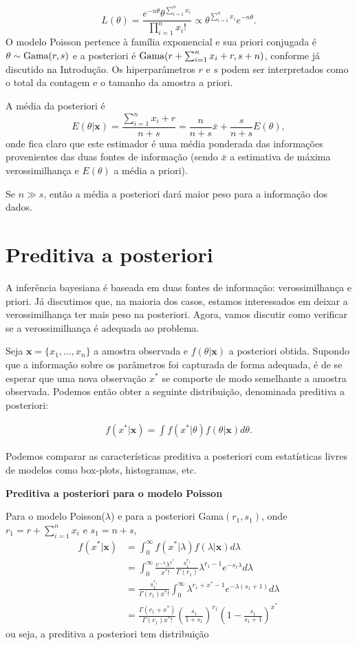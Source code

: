 \documentclass[
  letterpaper,
  DIV=11,
  numbers=noendperiod]{scrreprt}
\theoremstyle{definition}
\theoremstyle{definition}
\theoremstyle{plain}
\theoremstyle{remark}
\begin{document}
\[L(\theta)=\frac{e^{-n\theta}\theta^{\sum_{i=1}^{n}x_i}}{\prod_{i=1}^{n}x_i!}\propto \theta^{\sum_{i=1}^n x_i}e^{-n\theta}.\]
O modelo Poisson pertence à família exponencial e sua priori conjugada é
\(\theta\sim\hbox{Gama}(r,s)\) e a posteriori é
\(\hbox{Gama}(r+\sum_{i=1}^n x_i+r, s+n)\), conforme já discutido na
Introdução. Os hiperparâmetros \(r\) e \(s\) podem ser interpretados
como o total da contagem e o tamanho da amostra a priori.

A média da posteriori é
\[E(\theta|\mathbf{x})=\frac{\sum_{i=1}^{n}x_i+r}{n+s}=\frac{n}{n+s}\bar{x}+\frac{s}{n+s}E(\theta),\]
onde fica claro que este estimador é uma média ponderada das informações
provenientes das duas fontes de informação (sendo \(\bar{x}\) a
estimativa de máxima verossimilhança e \(E(\theta)\) a média a priori).

Se \(n\gg s\), então a média a posteriori dará maior peso para a
informação dos dados.

\section{Preditiva a posteriori}\label{preditiva-a-posteriori}

A inferência bayesiana é baseada em duas fontes de informação:
verossimilhança e priori. Já discutimos que, na maioria dos casos,
estamos interessados em deixar a verossimilhança ter mais peso na
posteriori. Agora, vamos discutir como verificar se a verossimilhança é
adequada ao problema.

Seja \(\boldsymbol{x}=\{x_1,\ldots,x_n\}\) a amostra observada e
\(f(\theta|\boldsymbol{x})\) a posteriori obtida. Supondo que a
informação sobre os parâmetros foi capturada de forma adequada, é de se
esperar que uma nova observação \(x^*\) se comporte de modo semelhante a
amostra observada. Podemos então obter a seguinte distribuição,
denominada preditiva a posteriori:

\[\begin{align}f(x^*|\boldsymbol{x})=\int f(x^*|\theta)f(\theta|\boldsymbol{x})d\theta.\end{align}\]

Podemos comparar as características preditiva a posteriori com
estatísticas livres de modelos como box-plots, histogramas, etc.

\textbf{Preditiva a posteriori para o modelo Poisson}

Para o modelo Poisson(\(\lambda\)) e para a posteriori
Gama\((r_1,s_1)\), onde \(r_1=r+\sum_{i=1}^n x_i\) e \(s_1=n+s\),
\[\begin{align}
f(x^*|\boldsymbol{x})&=\int_0^\infty f(x^*|\lambda)f(\lambda|\boldsymbol{x})d\lambda\\
&=\int_0^\infty\frac{e^{-\lambda}\lambda^{x^*}}{x^*!}\frac{s_1^{r_1}}{\Gamma(r_1)}\lambda^{r_1-1}e^{-s_1\lambda}d\lambda\\
&=\frac{s_1^{r_1}}{\Gamma(r_1)x^*!}\int_0^\infty \lambda^{r_1+x^*-1}e^{-\lambda(s_1+1)}d\lambda\\
&=\frac{\Gamma(r_1+x^*)}{\Gamma(r_1)x^*!}\left(\frac{s_1}{1+s_1}\right)^{r_1}\left(1 - \frac{s_1}{s_1+1}\right)^{x^*}
\end{align}\] ou seja, a preditiva a posteriori tem distribuição
\end{document}

